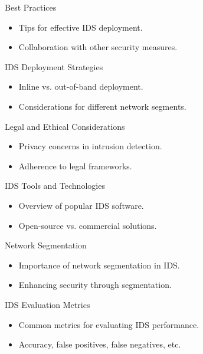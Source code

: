 \documentclass{beamer}
\begin{document}
\begin{frame}{Best Practices}
    \begin{itemize}
        \item Tips for effective IDS deployment.
        \item Collaboration with other security measures.
    \end{itemize}
\end{frame}



\begin{frame}{IDS Deployment Strategies}
    \begin{itemize}
        \item Inline vs. out-of-band deployment.
        \item Considerations for different network segments.
    \end{itemize}
\end{frame}


\begin{frame}{Legal and Ethical Considerations}
    \begin{itemize}
        \item Privacy concerns in intrusion detection.
        \item Adherence to legal frameworks.
    \end{itemize}
\end{frame}


\begin{frame}{IDS Tools and Technologies}
    \begin{itemize}
        \item Overview of popular IDS software.
        \item Open-source vs. commercial solutions.
    \end{itemize}
\end{frame}


\begin{frame}{Network Segmentation}
    \begin{itemize}
        \item Importance of network segmentation in IDS.
        \item Enhancing security through segmentation.
    \end{itemize}
\end{frame}


\begin{frame}{IDS Evaluation Metrics}
    \begin{itemize}
        \item Common metrics for evaluating IDS performance.
        \item Accuracy, false positives, false negatives, etc.
    \end{itemize}
\end{frame}
\end{document}
